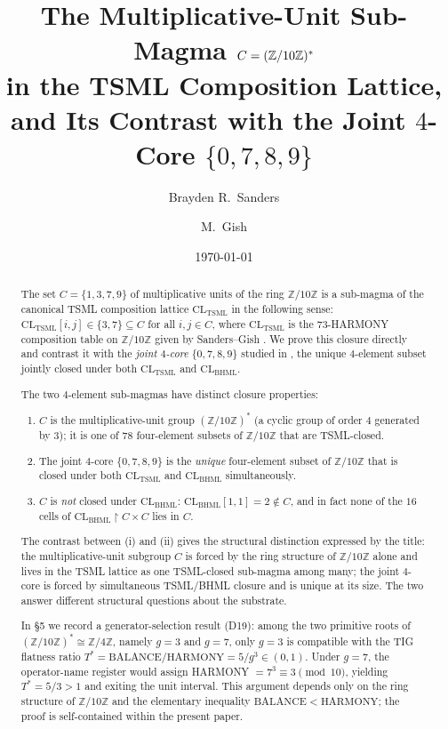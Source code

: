 \documentclass[11pt,reqno]{amsart}
\title[Multiplicative units of $\Z/10\Z$ and the joint 4-core]
{The Multiplicative-Unit Sub-Magma $C = (\Z/10\Z)^*$ \\
 in the TSML Composition Lattice, \\
 and Its Contrast with the Joint $4$-Core $\{0, 7, 8, 9\}$}
\author{Brayden R.\ Sanders}
\author{M.\ Gish}
\date{\today}
\theoremstyle{plain}
\theoremstyle{definition}
\theoremstyle{remark}
\newcommand{\Z}{\mathbb{Z}}
\newcommand{\TSML}{\mathrm{TSML}}
\newcommand{\BHML}{\mathrm{BHML}}
\begin{document}
\begin{abstract}
The set $C = \{1, 3, 7, 9\}$ of multiplicative units of the ring
$\Z/10\Z$ is a sub-magma of the canonical TSML composition lattice
$\mathrm{CL}_\TSML$ in the following sense: $\mathrm{CL}_\TSML[i, j] \in
\{3, 7\} \subseteq C$ for all $i, j \in C$, where $\mathrm{CL}_\TSML$ is
the $73$-HARMONY composition table on $\Z/10\Z$ given by Sanders--Gish
\cite{SandersForcing}.  We prove this closure directly and contrast it
with the \emph{joint $4$-core} $\{0, 7, 8, 9\}$ studied in
\cite{SandersGishFourCore}, the unique $4$-element subset jointly closed
under both $\mathrm{CL}_\TSML$ and $\mathrm{CL}_\BHML$.

The two $4$-element sub-magmas have distinct closure properties:
\begin{enumerate}[label={\emph{(\arabic*)}}]
\item $C$ is the multiplicative-unit group $(\Z/10\Z)^*$ (a cyclic group
of order $4$ generated by $3$); it is one of $78$ four-element subsets
of $\Z/10\Z$ that are TSML-closed.
\item The joint $4$-core $\{0, 7, 8, 9\}$ is the \emph{unique}
four-element subset of $\Z/10\Z$ that is closed under both
$\mathrm{CL}_\TSML$ and $\mathrm{CL}_\BHML$ simultaneously.
\item $C$ is \emph{not} closed under $\mathrm{CL}_\BHML$:
$\mathrm{CL}_\BHML[1, 1] = 2 \notin C$, and in fact none of the $16$
cells of $\mathrm{CL}_\BHML \restriction C \times C$ lies in $C$.
\end{enumerate}
The contrast between (i) and (ii) gives the structural distinction
expressed by the title: the multiplicative-unit subgroup $C$ is forced
by the ring structure of $\Z/10\Z$ alone and lives in the TSML lattice
as one TSML-closed sub-magma among many; the joint $4$-core is forced
by simultaneous TSML/BHML closure and is unique at its size.
The two answer different structural questions about the substrate.

In §5 we record a generator-selection result (D19): among the two
primitive roots of $(\Z/10\Z)^* \cong \Z/4\Z$, namely $g = 3$ and
$g = 7$, only $g = 3$ is compatible with the TIG flatness ratio
$T^* = \mathrm{BALANCE}/\mathrm{HARMONY} = 5/g^3 \in (0, 1)$.  Under
$g = 7$, the operator-name register would assign HARMONY $= 7^3
\equiv 3 \pmod{10}$, yielding $T^* = 5/3 > 1$ and exiting the unit
interval.  This argument depends only on the ring structure of
$\Z/10\Z$ and the elementary inequality
$\mathrm{BALANCE} < \mathrm{HARMONY}$; the proof is self-contained
within the present paper.
\end{abstract}
\end{document}
